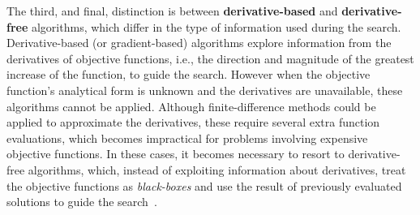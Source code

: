 	The third, and final, distinction is between \textbf{derivative-based} and \textbf{derivative-free} algorithms, which differ in the type of information used during the search. Derivative-based (or gradient-based) algorithms explore information from the derivatives of objective functions, i.e., the direction and magnitude of the greatest increase of the function, to guide the search. %
	However when the objective function's analytical form is unknown and the derivatives are unavailable, these algorithms cannot be applied. Although finite-difference methods could be applied to approximate the derivatives, these require several extra function evaluations, which becomes impractical for problems involving expensive objective functions. In these cases, it becomes necessary to resort to derivative-free algorithms, which, instead of exploiting information about derivatives, treat the objective functions as \textit{black-boxes} and use the result of previously evaluated solutions to guide the search~\cite{Rios2013}.
	
	
	
	
